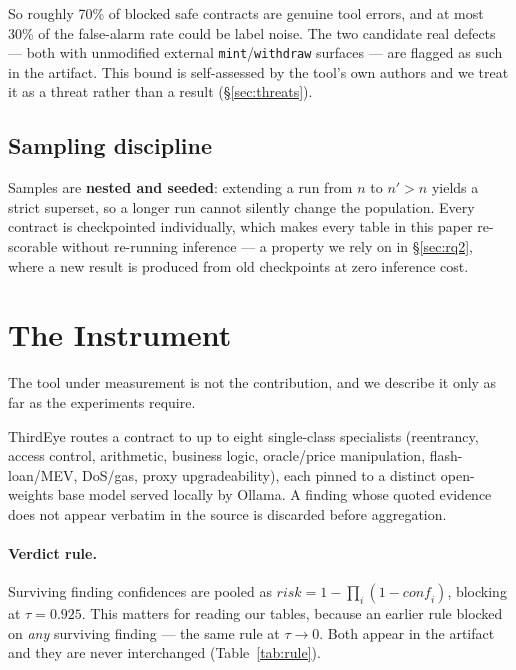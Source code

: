 \documentclass[sigconf,nonacm]{acmart}
\newcommand{\tool}{ThirdEye}
\begin{document}
So roughly 70\% of blocked safe contracts are genuine tool errors, and at most
30\% of the false-alarm rate could be label noise. The two candidate real defects
--- both with unmodified external \texttt{mint}/\texttt{withdraw} surfaces ---
are flagged as such in the artifact. This bound is self-assessed by the tool's
own authors and we treat it as a threat rather than a result
(\S\ref{sec:threats}).

\subsection{Sampling discipline}

Samples are \textbf{nested and seeded}: extending a run from $n$ to $n' > n$
yields a strict superset, so a longer run cannot silently change the population.
Every contract is checkpointed individually, which makes every table in this
paper re-scorable without re-running inference --- a property we rely on in
\S\ref{sec:rq2}, where a new result is produced from old checkpoints at zero
inference cost.

\section{The Instrument}

The tool under measurement is not the contribution, and we describe it only as
far as the experiments require.

\tool{} routes a contract to up to eight single-class specialists (reentrancy,
access control, arithmetic, business logic, oracle/price manipulation,
flash-loan/MEV, DoS/gas, proxy upgradeability), each pinned to a distinct
open-weights base model served locally by Ollama. A finding whose quoted evidence
does not appear verbatim in the source is discarded before aggregation.

\paragraph{Verdict rule.}
Surviving finding confidences are pooled as
$\mathit{risk} = 1 - \prod_i (1 - \mathit{conf}_i)$, blocking at $\tau = 0.925$.
This matters for reading our tables, because an earlier rule blocked on
\emph{any} surviving finding --- the same rule at $\tau \to 0$. Both appear in the
artifact and they are never interchanged (Table~\ref{tab:rule}).
\end{document}
